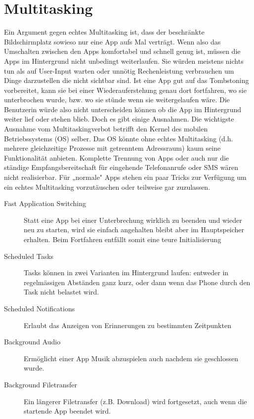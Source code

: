 \documentclass[a4paper,10pt]{scrreprt}
\begin{document}
\chapter{Multitasking}
Ein Argument gegen echtes Multitasking ist, dass der beschränkte Bildschirmplatz sowieso nur eine App aufs
Mal verträgt. Wenn also das Umschalten zwischen den Apps komfortabel und schnell genug ist, müssen die
Apps im Hintergrund nicht unbedingt weiterlaufen. Sie würden meistens nichts tun als auf User-Input warten
oder unnötig Rechenleistung verbrauchen um Dinge darzustellen die nicht sichtbar sind.
Ist eine App gut auf das Tombstoning vorbereitet, kann sie bei einer Wiederauferstehung genau dort fortfahren,
wo sie unterbrochen wurde, bzw. wo sie stünde wenn sie weitergelaufen wäre. Die Benutzerin würde also nicht
unterscheiden können ob die App im Hintergrund weiter lief oder stehen blieb.
Doch es gibt einige Ausnahmen. Die wichtigste Ausnahme vom Multitaskingverbot betrifft den Kernel des
mobilen Betriebssystems (OS) selber. Das OS könnte ohne echtes Multitasking (d.h. mehrere gleichzeitige
Prozesse mit getrenntem Adressraum) kaum seine Funktionalität anbieten. Komplette Trennung von Apps oder
auch nur die ständige Empfangsbereitschaft für eingehende Telefonanrufe oder SMS wären nicht realisierbar.
Für „normale" Apps stehen ein paar Tricks zur Verfügung um ein echtes Multitasking vorzutäuschen oder
teilweise gar zuzulassen.
\begin{description}
\item[Fast Application Switching]Statt eine App bei einer Unterbrechung wirklich zu beenden und wieder neu zu starten, 
wird sie einfach
angehalten bleibt aber im Hauptspeicher erhalten. Beim Fortfahren entfällt somit eine teure Initialisierung
\item[Scheduled Tasks] Tasks können in zwei Varianten im Hintergrund laufen: entweder in regelmässigen Abständen ganz 
kurz,
oder dann wenn das Phone durch den Task nicht belastet wird.
\item[Scheduled Notifications] Erlaubt das Anzeigen von Erinnerungen zu bestimmten Zeitpunkten
\item[Background Audio] Ermöglicht einer App Musik abzuspielen auch nachdem sie geschlossen wurde.
\item[Background Filetransfer] Ein längerer Filetransfer (z.B. Download) wird fortgesetzt, auch wenn die startende App 
beendet wird.
\end{description}
\end{document}
